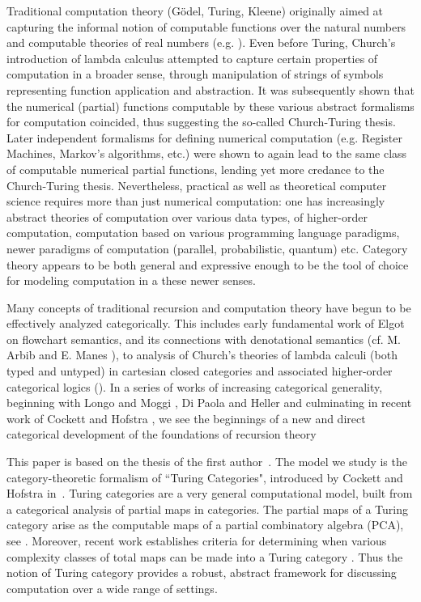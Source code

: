 \documentclass{entcs} \usepackage{entcsmacro}
\begin{document}
Traditional computation theory (G\"odel, Turing, Kleene) originally aimed at capturing the 
informal notion of computable functions over the natural numbers and computable theories of real numbers
(e.g. \cite{Turing-Paper,IMM}).  Even before Turing, Church's introduction of lambda calculus \cite{Church}  attempted to capture certain properties of computation in a broader sense,
through manipulation of strings of symbols representing function application and abstraction. It was subsequently shown that the
numerical (partial) functions computable by these various abstract formalisms for computation coincided, thus suggesting the so-called Church-Turing thesis.  Later independent formalisms
for defining numerical computation (e.g. Register Machines, Markov's algorithms, etc.) were shown to again lead to the same class of computable numerical partial functions, lending yet more credance to the Church-Turing thesis.  Nevertheless, practical as well as theoretical computer science requires more than just numerical computation:  one has increasingly abstract theories of computation over various data types, of higher-order computation, computation based on various programming language paradigms, newer paradigms of computation (parallel, probabilistic, quantum) etc.  Category theory appears to be both general and expressive enough to be 
the tool of choice for modeling computation in a these newer senses. 

Many concepts of traditional recursion and computation theory have begun to be effectively analyzed categorically.  This includes early fundamental work of Elgot on flowchart semantics,
and its connections with denotational semantics  (cf.  M. Arbib and E. Manes \cite{MA}), to 
analysis of Church's theories of lambda calculi (both typed and untyped) in cartesian closed categories and associated higher-order categorical logics (\cite{HOCL}).  In a series of works
of increasing categorical generality, beginning with Longo and Moggi \cite{LMog}, Di Paola and Heller \cite{DiPao} and culminating in recent work of Cockett and Hofstra \cite{Turing}, we see the beginnings of a new and direct categorical development of the foundations of recursion theory 


This paper is based on the thesis of the first author~\cite{MyPhD}.
The model we study is the category-theoretic formalism of ``Turing Categories", introduced by Cockett and Hofstra in~\cite{Turing}. Turing categories are a very general computational model, built from a categorical analysis of 
partial maps in categories. The partial maps of a Turing category arise as the computable maps of a partial combinatory algebra (PCA), see \cite{Turing}.  Moreover,  recent work establishes criteria for 
determining when various complexity classes of total maps  can be made into a Turing category
\cite{Total}.  Thus the notion of Turing category provides a robust, abstract framework for discussing computation over a wide range of settings. 
\end{document}
